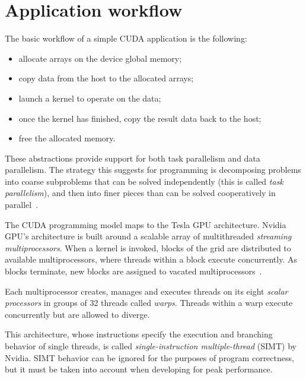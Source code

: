 \section{Application workflow}
\label{sec:app-workflow}

The basic workflow of a simple CUDA application is the following:
\begin{itemize}
  \item allocate arrays on the device global memory;
  \item copy data from the host to the allocated arrays;
  \item launch a kernel to operate on the data;
  \item once the kernel has finished,
    copy the result data back to the host;
  \item free the allocated memory.
\end{itemize}




These abstractions provide support
for both task parallelism and data parallelism.
The strategy this suggests for programming
is decomposing problems into coarse subproblems
that can be solved independently
(this is called \emph{task parallelism}),
and then into finer pieces
than can be solved cooperatively in parallel~\cite[\S1.1]{cudaprog2}.

The CUDA programming model maps to the Tesla GPU architecture.
Nvidia GPU's architecture is built around
a scalable array of multithreaded \emph{streaming multiprocessors}.
When a kernel is invoked,
blocks of the grid are distributed to available multiprocessors,
where threads within a block execute concurrently.
As blocks terminate,
new blocks are assigned to vacated multiprocessors~\cite[\S3]{cudaprog2}.

Each multiprocessor creates, manages and executes threads
on its eight \emph{scalar processors}
in groups of 32 threads called \emph{warps}.
Threads within a warp execute concurrently
but are allowed to diverge.

This architecture,
whose instructions specify
the execution and branching behavior of single threads,
is called \emph{single-instruction multiple-thread} (SIMT) by Nvidia.
SIMT behavior can be ignored for the purposes of program correctness,
but it must be taken into account when developing for peak performance.

